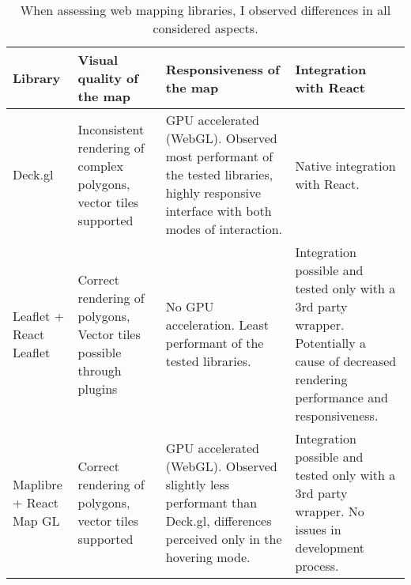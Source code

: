 \begin{table}[H]
	\caption{
		When assessing web mapping libraries,
		I observed differences in all considered aspects.
	}
	\label{tab:map library comparison}
	\centering
	\begin{tabular}{ | L{0.13\textwidth} | L{0.25\textwidth} | L{0.25\textwidth} | L{0.25\textwidth} | }
		\hline
		\textbf{Library}
		& \textbf{Visual quality of the map}
		& \textbf{Responsiveness of the map}
		& \textbf{Integration with React}
		\\
		\hline
		\hline
		Deck.gl
		& Inconsistent rendering of complex polygons, vector tiles supported
		& GPU accelerated (WebGL).
		Observed most performant of the tested libraries,
		highly responsive interface with both modes of interaction.
		& Native integration with React.
		\\
		\hline
		Leaflet + React Leaflet
		& Correct rendering of polygons, Vector tiles possible through plugins
		& No GPU acceleration. Least performant of the tested libraries.
		& Integration possible and tested only with a 3rd party wrapper.
		Potentially a cause of decreased rendering performance and responsiveness.
		\\
		\hline
		Maplibre + React Map GL
		& Correct rendering of polygons, vector tiles supported
		& GPU accelerated (WebGL).
		Observed slightly less performant than Deck.gl,
		differences perceived only in the hovering mode.
		& Integration possible and tested only with a 3rd party wrapper.
		No issues in development process.
		\\
		\hline
	\end{tabular}
\end{table}
